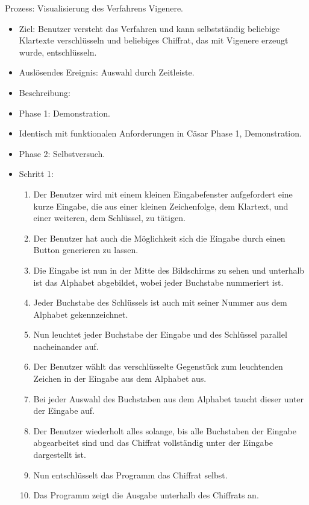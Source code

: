 \documentclass{article}
\begin{document}

\begin{FA}[start=120]
 \item Prozess: Visualisierung des Verfahrens Vigenere.
\end{FA}
\begin{itemize}[label={}]

 \item Ziel: Benutzer versteht das Verfahren und kann selbstständig beliebige Klartexte verschlüsseln und beliebiges Chiffrat, das mit Vigenere erzeugt wurde, entschlüsseln.

 \item Auslösendes Ereignis: Auswahl durch Zeitleiste.

 \item Beschreibung:

 \item Phase 1: Demonstration.

 \item Identisch mit funktionalen Anforderungen in Cäsar Phase 1, Demonstration. 

 \item Phase 2: Selbstversuch.

 \item Schritt 1:

	\begin{enumerate}
	   \item Der Benutzer wird mit einem kleinen Eingabefenster aufgefordert eine kurze Eingabe, 
                 die aus einer kleinen Zeichenfolge, dem Klartext, und einer weiteren, dem Schlüssel, zu tätigen.
	   \item Der Benutzer hat auch die Möglichkeit sich die Eingabe durch einen Button generieren zu lassen.
	   \item Die Eingabe ist nun in der Mitte des Bildschirms zu sehen und unterhalb ist das Alphabet 
		 abgebildet, wobei jeder Buchstabe nummeriert ist.
	   \item Jeder Buchstabe des Schlüssels ist auch mit seiner Nummer aus dem Alphabet gekennzeichnet.
	   \item Nun leuchtet jeder Buchstabe der Eingabe und des Schlüssel parallel nacheinander auf.
	   \item Der Benutzer wählt das verschlüsselte Gegenstück zum leuchtenden Zeichen in der Eingabe aus dem Alphabet aus. 
	   \item Bei jeder Auswahl des Buchstaben aus dem Alphabet taucht dieser unter der Eingabe auf.
	   \item Der Benutzer wiederholt alles solange, bis alle Buchstaben der Eingabe abgearbeitet sind 
		   und das Chiffrat vollständig unter der Eingabe dargestellt ist.
	   \item Nun entschlüsselt das Programm das Chiffrat selbst.
	   \item Das Programm zeigt die Ausgabe unterhalb des Chiffrats an.
	\end{enumerate}


\end{itemize}
\end{document}
